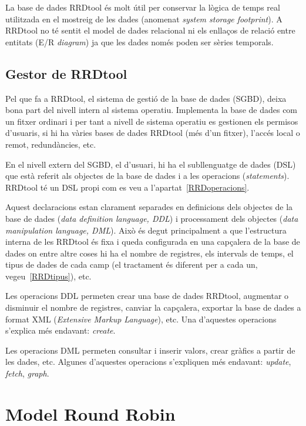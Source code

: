 La base de dades RRDtool és molt útil per conservar la lògica de temps real utilitzada en el mostreig de les dades (anomenat \emph{system storage footprint}).  A RRDtool no té sentit el model de dades relacional ni els enllaços de relació entre entitats (E/R \emph{diagram}) ja que les dades només poden ser sèries temporals.  



\subsection{Gestor de RRDtool}

Pel que fa a RRDtool, el sistema de gestió de la base de dades (SGBD), deixa bona part del nivell intern al sistema operatiu. Implementa la base de dades com un fitxer ordinari i per tant a nivell de sistema operatiu es gestionen els permisos d'usuaris, si hi ha vàries bases de dades RRDtool (més d'un fitxer), l'accés local o remot, redundàncies, etc.

En el nivell extern del SGBD, el d'usuari, hi ha el subllenguatge de dades (DSL) que està referit als objectes de la base de dades i a les operacions (\emph{statements}). RRDtool té un DSL propi com es veu a l'apartat~\ref{RRDoperacions}. 

Aquest declaracions estan clarament separades en definicions dels objectes de la base de dades (\emph{data definition language, DDL}) i processament dels objectes (\emph{data manipulation language, DML}). Això és degut principalment a que l'estructura interna de les RRDtool és fixa i queda configurada en una capçalera de la base de dades on entre altre coses hi ha el nombre de registres, els intervals de temps, el tipus de dades de cada camp (el tractament és diferent per a cada un, vegeu~\ref{RRDtipus}), etc. 

Les operacions DDL permeten crear una base de dades RRDtool, augmentar o disminuir el nombre de registres, canviar la capçalera, exportar la base de dades a format XML (\emph{Extensive Markup Language}), etc.  Una d'aquestes operacions s'explica més endavant: \emph{create}.

Les operacions DML permeten consultar i inserir valors, crear gràfics a partir de les dades, etc. Algunes d'aquestes operacions s'expliquen més endavant: \emph{update}, \emph{fetch}, \emph{graph}.







\section{Model Round Robin}

